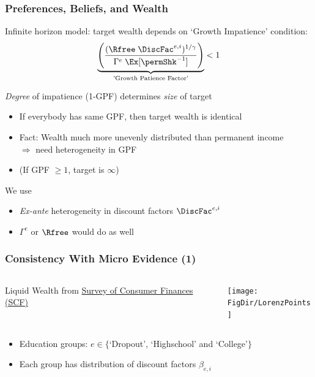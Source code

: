 \documentclass[pdflatex,aspectratio=169]{beamer}
\providecommand{\PermGroFac}{\Gamma}
\begin{document}
\begin{frame}
  \frametitle{Preferences, Beliefs, and Wealth}
  Infinite horizon model: target wealth depends on `Growth Impatience' condition:
  \begin{equation}
    \underbrace{
      \left(
      \frac{(\Rfree \; \DiscFac^{e,i})^{1/\gamma}}
      {\PermGroFac^{e} \; \Ex[\permShk^{-1}]}
      \right)
    }_{\text{'Growth Patience Factor'}}
    < 1
  \end{equation}

  \pause
  \emph{Degree} of impatience (1-GPF) determines \emph{size} of target
  \begin{itemize}[<+->]
    \item
          If everybody has same GPF, then target wealth is identical
    \item
          Fact: Wealth much more unevenly distributed than permanent income \\[1ex]
          $\Rightarrow$ need heterogeneity in GPF
    \item
          (If GPF $\geq 1$, target is $\infty$)
  \end{itemize}


  \pause
  We use
  \begin{itemize}[<+->]
    \item
          \textit{Ex-ante} heterogeneity in discount factors $\DiscFac^{e,i}$
    \item
          $\PermGroFac^{e}$ or $\Rfree$ would do as well
  \end{itemize}

\end{frame}

\begin{frame}
  \frametitle{Consistency With Micro Evidence (1)}
  \begin{columns}
    \begin{column}{0.3\linewidth}
      Liquid Wealth from \href{https://www.federalreserve.gov/econres/scfindex.htm}{Survey of Consumer Finances (SCF)}
    \end{column}
    \begin{column}{0.7\linewidth}
      \texttt{[image: \\FigDir/LorenzPoints]}
    \end{column}
  \end{columns}
  \medskip
  \begin{itemize}
    \item
          Education groups: $e\in\{$`Dropout', `Highschool' and `College'$\}$
    \item
          Each group has distribution of discount factors $\beta_{e,i}$
  \end{itemize}
\end{frame}
\end{document}
